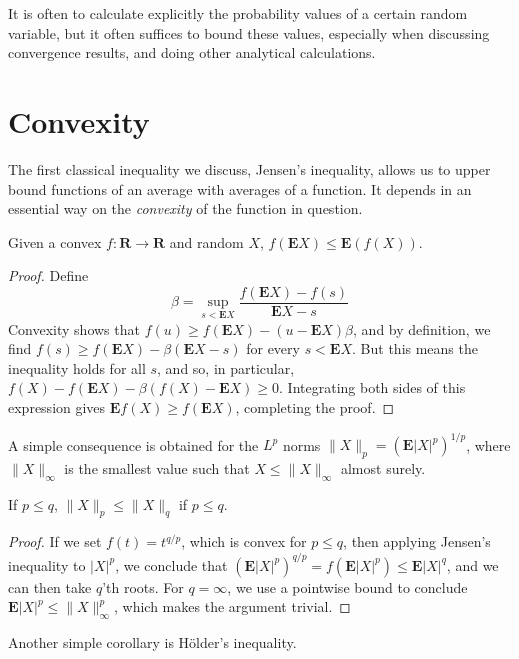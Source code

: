 It is often to calculate explicitly the probability values of a certain random variable, but it often suffices to bound these values, especially when discussing convergence results, and doing other analytical calculations.

\section{Convexity}

The first classical inequality we discuss, Jensen's inequality, allows us to upper bound functions of an average with averages of a function. It depends in an essential way on the {\it convexity} of the function in question.

\begin{theorem}
    Given a convex $f: \mathbf{R} \to \mathbf{R}$ and random $X$, $f(\mathbf{E} X) \leq \mathbf{E}(f(X))$.
\end{theorem}
\begin{proof}
    Define
    \[ \beta = \sup_{s < \mathbf{E}X} \frac{f(\mathbf{E}X) - f(s)}{\mathbf{E} X - s} \]
    Convexity shows that $f(u) \geq f(\mathbf{E}X) - (u-\mathbf{E}X) \beta$, and by definition, we find $f(s) \geq f(\mathbf{E}X) - \beta (\mathbf{E} X - s)$ for every $s < \mathbf{E}X$. But this means the inequality holds for all $s$, and so, in particular, $f(X) - f(\mathbf{E} X) - \beta(f(X) - \mathbf{E}X) \geq 0$. Integrating both sides of this expression gives $\mathbf{E} f(X) \geq f(\mathbf{E} X)$, completing the proof.
\end{proof}

A simple consequence is obtained for the $L^p$ norms $\| X \|_p = (\mathbf{E} |X|^p)^{1/p}$, where $\| X \|_\infty$ is the smallest value such that $X \leq \| X \|_\infty$ almost surely.

\begin{corollary}
    If $p \leq q$, $\| X \|_p \leq \| X \|_q$ if $p \leq q$.
\end{corollary}
\begin{proof}
    If we set $f(t) = t^{q/p}$, which is convex for $p \leq q$, then applying Jensen's inequality to $|X|^p$, we conclude that $(\mathbf{E} |X|^p)^{q/p} = f(\mathbf{E} |X|^p) \leq \mathbf{E} |X|^q$, and we can then take $q$'th roots. For $q = \infty$, we use a pointwise bound to conclude $\mathbf{E}|X|^p \leq \| X \|_\infty^p$, which makes the argument trivial.
\end{proof}

Another simple corollary is H\"{o}lder's inequality.

